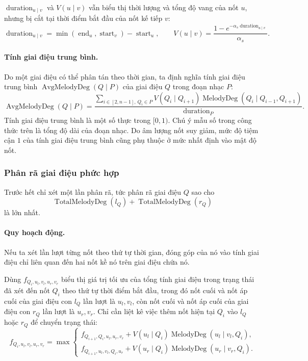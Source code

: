 \documentclass[11pt]{article}
\begin{document}
\(\operatorname{duration}_{u\mid v}\) và \(V(u\mid v)\) vẫn biểu thị thời
lượng và tổng độ vang của nốt \(u\), nhưng bị cắt tại thời điểm bắt đầu của
nốt kế tiếp \(v\):
\[
  \operatorname{duration}_{u\mid v}=
  \min(\operatorname{end}_u,\operatorname{start}_v)-\operatorname{start}_u,
  \qquad
  V(u\mid v)=
  \frac{1-e^{-\alpha_s\operatorname{duration}_{u\mid v}}}{\alpha_s}.
\]

\paragraph{Tính giai điệu trung bình.}
Do một giai điệu có thể phân tán theo thời gian, ta định nghĩa tính giai điệu
trung bình \(\operatorname{AvgMelodyDeg}(Q\mid P)\) của giai điệu \(Q\) trong
đoạn nhạc \(P\):
\[
  \operatorname{AvgMelodyDeg}(Q\mid P)=
  \frac{
    \sum_{i\in[2,n-1],\,Q_i\in P}
    V(Q_i\mid Q_{i+1})
    \operatorname{MelodyDeg}(Q_i\mid Q_{i-1},Q_{i+1})
  }{\operatorname{duration}_P}.
\]
Tính giai điệu trung bình là một số thực trong \([0,1)\). Chú ý mẫu số trong
công thức trên là tổng độ dài của đoạn nhạc. Do âm lượng nốt suy giảm, mức độ
tiệm cận \(1\) của tính giai điệu trung bình cũng phụ thuộc ở mức nhất định
vào mật độ nốt.

\subsubsection{Phân rã giai điệu phức hợp}

Trước hết chỉ xét một lần phân rã, tức phân rã giai điệu \(Q\) sao cho
\[
  \operatorname{TotalMelodyDeg}(l_Q)+\operatorname{TotalMelodyDeg}(r_Q)
\]
là lớn nhất.

\paragraph{Quy hoạch động.}
Nếu ta xét lần lượt từng nốt theo thứ tự thời gian, đóng góp của nó vào tính
giai điệu chỉ liên quan đến hai nốt kề nó trên giai điệu chứa nó.

Dùng \(f_{Q_i,u_l,v_l,u_r,v_r}\) biểu thị giá trị tối ưu của tổng tính giai
điệu trong trạng thái đã xét đến nốt \(Q_i\) theo thứ tự thời điểm bắt đầu,
trong đó nốt cuối và nốt áp cuối của giai điệu con \(l_Q\) lần lượt là
\(u_l,v_l\), còn nốt cuối và nốt áp cuối của giai điệu con \(r_Q\) lần lượt
là \(u_r,v_r\). Chỉ cần liệt kê việc thêm nốt hiện tại \(Q_i\) vào \(l_Q\)
hoặc \(r_Q\) để chuyển trạng thái:
\[
  f_{Q_i,u_l,v_l,u_r,v_r}=\max
  \begin{cases}
  f_{Q_{i+1},Q_i,u_l,u_r,v_r}
  +V(u_l\mid Q_i)\operatorname{MelodyDeg}(u_l\mid v_l,Q_i),\\
  f_{Q_{i+1},u_l,v_l,Q_i,u_r}
  +V(u_r\mid Q_i)\operatorname{MelodyDeg}(u_r\mid v_r,Q_i).
  \end{cases}
\]
\end{document}
